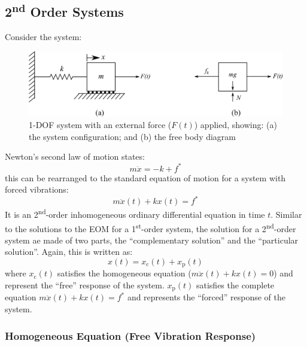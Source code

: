 \documentclass[12pt,letter]{article}
\begin{document}
\subsection{2\textsuperscript{nd} Order Systems}


Consider the system:
			\begin{figure}[H]
				\centering
				\includegraphics[]{../figures/1-DOF-spring_mass_horizontal_forced_FBD.png}
				\caption{1-DOF system with an external force ($F(t)$) applied, showing: (a) the system configuration; and (b) the free body diagram}
				\label{fig:1-DOF-spring_mass_horizontal_forced_FBD}
			\end{figure}	

Newton's second law of motion states:
\begin{equation}
m \ddot{x} = -k + f^*
\end{equation}
this can be rearranged to the standard equation of motion for a system with forced vibrations:
\begin{equation}
m \ddot{x}(t) + kx(t) = f^*
\label{eq:EOM_2nd}
\end{equation}
It is an 2\textsuperscript{nd}-order inhomogeneous ordinary differential equation in time $t$.  Similar to the solutions to the EOM for a 1\textsuperscript{st}-order system, the solution for a 2\textsuperscript{nd}-order system ae made of two parts, the ``complementary solution'' and the ``particular solution''. Again, this is written as:
\begin{equation}
x(t) = x_\text{c}(t)+x_\text{p}(t)
\end{equation}
where $x_\text{c}(t)$ satisfies the homogeneous equation ($m \ddot{x}(t) + kx(t) = 0$) and represent the ``free'' response of the system. $x_\text{p}(t)$ satisfies the complete equation $m \ddot{x}(t) + kx(t) = f^*$ and represents the ``forced'' response of the system.


\subsubsection{Homogeneous Equation (Free Vibration Response)}
\end{document}
